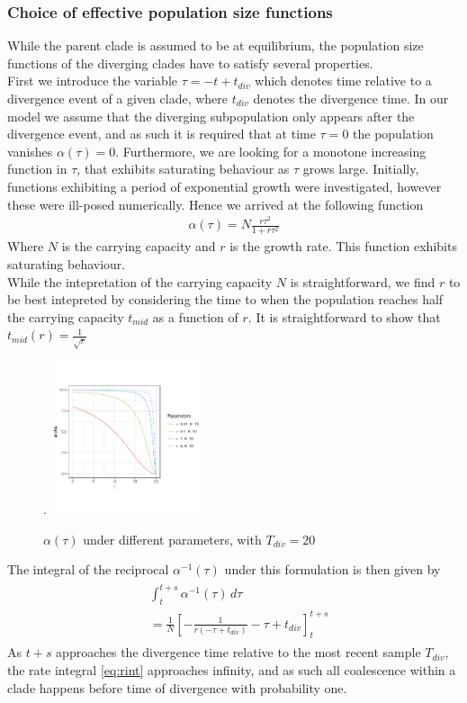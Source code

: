 \documentclass{report}
\theoremstyle{definition}
\begin{document}
\subsubsection{Choice of effective population size functions}
While the parent clade is assumed to be at equilibrium, the population size functions of the diverging clades have to satisfy several properties.\\
First we introduce the variable $\tau = -t + t_{div}$ which denotes time relative to a divergence event of a given clade, where $t_{div}$ denotes the divergence time.
In our model we assume that the diverging subpopulation only appears after the divergence event, and as such it is required that at time $\tau=0$ the population vanishes $\alpha(\tau)=0$. Furthermore, we are looking for a monotone increasing function in $\tau$, that exhibits saturating behaviour as $\tau$ grows large.
Initially, functions exhibiting a period of exponential growth were investigated, however these were ill-posed numerically.
Hence we arrived at the following function
\begin{gather}
\alpha(\tau) = N\frac{r\tau^2}{1+r\tau^2}
\end{gather} 
Where $N$ is the carrying capacity and $r$ is the growth rate.
This function  exhibits saturating behaviour.\\
While the intepretation of the carrying capacity $N$ is straightforward, we find $r$ to be best intepreted by considering the time to when the population reaches half the carrying capacity $t_{mid}$ as a function of $r$. It is straightforward to show that $t_{mid}(r) = \frac{1}{\sqrt{r}}$ 
\begin{figure}[H].
  \centering
     \includegraphics[width=0.4\textwidth]{../R/test_mcmc/alpha_plots}
    \caption{$\alpha(\tau)$ under different parameters, with $T_{div}=20$}
\end{figure}
The integral of the reciprocal $\alpha^{-1}(\tau)$ under this formulation is then given by 
\begin{gather}
\begin{aligned}\label{eq:rint}
&\int_{t}^{t+s}\alpha^{-1}(\tau)\,d\tau\\ &= \frac{1}{N}\left[-\frac{1}{r(-\tau+t_{div})}-\tau+t_{div}\right]_{t}^{t+s}
\end{aligned}
\end{gather}
As $t+s$ approaches the divergence time relative to the most recent sample $T_{div}$, the rate integral \ref{eq:rint} approaches infinity, and as such all coalescence within a clade happens before time of divergence with probability one.
\end{document}
